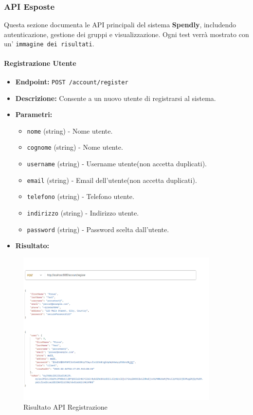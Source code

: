 \subsubsection{API Esposte}

Questa sezione documenta le API principali del sistema \textbf{Spendly}, includendo autenticazione, gestione dei gruppi e visualizzazione. Ogni test verrà mostrato con un' \texttt{immagine dei risultati}.

\paragraph{Registrazione Utente}
\begin{itemize}
    \item \textbf{Endpoint:} \texttt{POST /account/register}
    \item \textbf{Descrizione:} Consente a un nuovo utente di registrarsi al sistema.
    \item \textbf{Parametri:}
    \begin{itemize}
        \item \texttt{nome} (string) - Nome utente.
        \item \texttt{cognome} (string) - Nome utente.
        \item \texttt{username} (string) - Username utente(non accetta duplicati).
        \item \texttt{email} (string) - Email dell'utente(non accetta duplicati).
        \item \texttt{telefono} (string) - Telefono utente.
        \item \texttt{indirizzo} (string) - Indirizzo utente.
        \item \texttt{password} (string) - Password scelta dall'utente.
    \end{itemize}
    \item \textbf{Risultato:}
\end{itemize}
\begin{figure}[H]
    \centering
    \includegraphics[width=0.9\textwidth]{images/registerapi.png}
    \caption{Risultato API Registrazione}
    \label{fig:api_register}
\end{figure}

